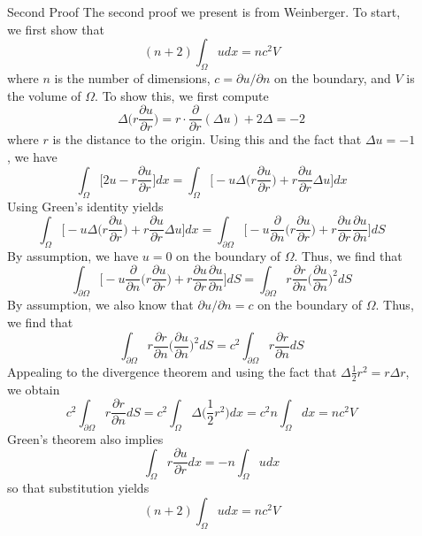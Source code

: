 \documentclass[final]{beamer}
\newlength{\sepwidth}
\newlength{\colwidth}
\newcommand{\separatorcolumn}{\begin{column}{\sepwidth}\end{column}}
\begin{document}
\begin{frame}[t]
\begin{columns}[t]
\begin{column}{\colwidth}
  \begin{block}{Second Proof}
	The second proof we present is from Weinberger. To start, we first show that
	\[
	(n+2) \int_\Omega u dx = nc^2 V
	\] where $n$ is the number of dimensions, $c = \partial{u}/\partial{n}$ on the boundary, and $V$ is the volume of $\Omega$. To show this, we first compute
	\[
	\Delta\bigg(r \frac{\partial{u}}{\partial{r}}\bigg) = r \cdot \frac{\partial}{\partial{r}} (\Delta u) + 2\Delta = -2
	\] where $r$ is the distance to the origin. Using this and the fact that $\Delta u = -1$, we have
	\[
	\int_\Omega \bigg[ 2u - r\frac{\partial{u}}{\partial{r}}\bigg] dx = \int_\Omega \bigg[ -u \Delta \bigg(r \frac{\partial{u}}{\partial{r}} \bigg) + r \frac{\partial{u}}{\partial{r}} \Delta u \bigg] dx
	\]
    	Using Green's identity yields
	\[
	\int_\Omega \bigg[ -u \Delta \bigg(r \frac{\partial{u}}{\partial{r}} \bigg) + r \frac{\partial{u}}{\partial{r}} \Delta u \bigg] dx = \int_{\partial{\Omega}} \bigg[ - u \frac{\partial}{\partial{n}}\bigg(r\frac{\partial{u}}{\partial{r}}\bigg)+ r \frac{\partial{u}}{\partial{r}}\frac{\partial{u}}{\partial{n}}\bigg] dS
	\] By assumption, we have $u = 0$ on the boundary of $\Omega$. Thus, we find that
	\[
	 \int_{\partial{\Omega}} \bigg[ - u \frac{\partial}{\partial{n}}\bigg(r\frac{\partial{u}}{\partial{r}}\bigg)+ r \frac{\partial{u}}{\partial{r}}\frac{\partial{u}}{\partial{n}}\bigg] dS =  \int_{\partial{\Omega}} r \frac{\partial{r}}{\partial{n}} \bigg(\frac{\partial{u}}{\partial{n}}\bigg)^2 dS
	\] By assumption, we also know that $\partial{u}/\partial{n} = c$ on the boundary of $\Omega$. Thus, we find that
	\[
	\int_{\partial{\Omega}} r \frac{\partial{r}}{\partial{n}} \bigg(\frac{\partial{u}}{\partial{n}}\bigg)^2 dS = c^2 \int_{\partial{\Omega}} r\frac{\partial{r}}{\partial{n}} dS
	\] Appealing to the divergence theorem and using the fact that $\Delta \frac{1}{2}r^2 = r \Delta r$, we obtain
	\[
	 c^2 \int_{\partial{\Omega}} r\frac{\partial{r}}{\partial{n}} dS = c^2 \int_{\Omega} \Delta\bigg(\frac{1}{2}r^2\bigg) dx = c^2 n \int_{\Omega} dx =  nc^2 V
	\] Green's theorem also implies 
	\[
	\int_{\Omega} r \frac{\partial{u}}{\partial{r}} dx = -n \int_{\Omega} u dx
	\] so that substitution yields
	\[
	(n+2) \int_\Omega u d x = nc^2V
	\]
  \end{block}


\end{column}

\separatorcolumn

\begin{column}{\colwidth}


\end{column}
\end{columns}
\end{frame}
\end{document}
